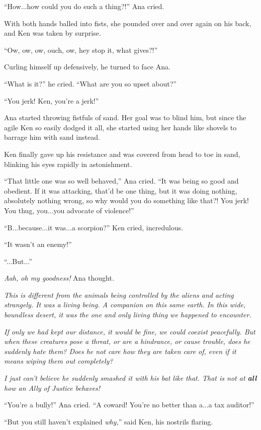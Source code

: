 \documentclass[
]{article}
\begin{document}
``How...how could you do such a thing?!'' Ana cried.

With both hands balled into fists, she pounded over and over again on
his back, and Ken was taken by surprise.

``Ow, ow, ow, ouch, ow, hey stop it, what gives?!''

Curling himself up defensively, he turned to face Ana.

``What is it?'' he cried. ``What are you so upset about?''

``You jerk! Ken, you're a jerk!''

Ana started throwing fistfuls of sand. Her goal was to blind him, but
since the agile Ken so easily dodged it all, she started using her hands
like shovels to barrage him with sand instead.

Ken finally gave up his resistance and was covered from head to toe in
sand, blinking his eyes rapidly in astonishment.

``That little one was so well behaved,'' Ana cried. ``It was being so
good and obedient. If it was attacking, that'd be one thing, but it was
doing nothing, absolutely nothing wrong, so why would you do something
like that?! You jerk! You thug, you...you advocate of violence!''

``B...because...it was...a scorpion?'' Ken cried, incredulous.

``It wasn't an enemy!''

``...But...''

\emph{Aah, oh my goodness! }Ana thought.

\emph{This is different from the animals being controlled by the aliens
and acting strangely. It was a living being. A companion on this same
earth. In this wide, boundless desert, it was the one and only living
thing we happened to encounter.}

\emph{If only we had kept our distance, it would be fine, we could
coexist peacefully. But when these creatures pose a threat, or are a
hindrance, or cause trouble, does he suddenly hate them? Does he not
care how they are taken care of, even if it means wiping them out
completely?}

\emph{I just can't believe he suddenly smashed it with his bat like
that. That is not at \textbf{all} how an Ally of Justice behaves!}

``You're a bully!'' Ana cried. ``A coward! You're no better than a...a
tax auditor!''

``But you still haven't explained \emph{why,}'' said Ken, his nostrils
flaring.
\end{document}
